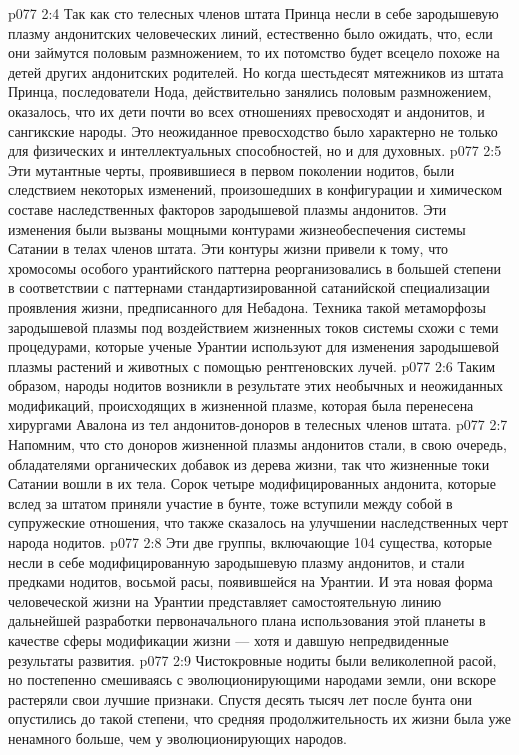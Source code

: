 \vs p077 2:4 Так как сто телесных членов штата Принца несли в себе зародышевую плазму андонитских человеческих линий, естественно было ожидать, что, если они займутся половым размножением, то их потомство будет всецело похоже на детей других андонитских родителей. Но когда шестьдесят мятежников из штата Принца, последователи Нода, действительно занялись половым размножением, оказалось, что их дети почти во всех отношениях превосходят и андонитов, и сангикские народы. Это неожиданное превосходство было характерно не только для физических и интеллектуальных способностей, но и для духовных.
\vs p077 2:5 Эти мутантные черты, проявившиеся в первом поколении нодитов, были следствием некоторых изменений, произошедших в конфигурации и химическом составе наследственных факторов зародышевой плазмы андонитов. Эти изменения были вызваны мощными контурами жизнеобеспечения системы Сатании в телах членов штата. Эти контуры жизни привели к тому, что хромосомы особого урантийского паттерна реорганизовались в большей степени в соответствии с паттернами стандартизированной сатанийской специализации проявления жизни, предписанного для Небадона. Техника такой метаморфозы зародышевой плазмы под воздействием жизненных токов системы схожи с теми процедурами, которые ученые Урантии используют для изменения зародышевой плазмы растений и животных с помощью рентгеновских лучей.
\vs p077 2:6 Таким образом, народы нодитов возникли в результате этих необычных и неожиданных модификаций, происходящих в жизненной плазме, которая была перенесена хирургами Авалона из тел андонитов\hyp{}доноров в телесных членов штата.
\vs p077 2:7 \pc Напомним, что сто доноров жизненной плазмы андонитов стали, в свою очередь, обладателями органических добавок из дерева жизни, так что жизненные токи Сатании вошли в их тела. Сорок четыре модифицированных андонита, которые вслед за штатом приняли участие в бунте, тоже вступили между собой в супружеские отношения, что также сказалось на улучшении наследственных черт народа нодитов.
\vs p077 2:8 Эти две группы, включающие 104 существа, которые несли в себе модифицированную зародышевую плазму андонитов, и стали предками нодитов, восьмой расы, появившейся на Урантии. И эта новая форма человеческой жизни на Урантии представляет самостоятельную линию дальнейшей разработки первоначального плана использования этой планеты в качестве сферы модификации жизни --- хотя и давшую непредвиденные результаты развития.
\vs p077 2:9 \pc Чистокровные нодиты были великолепной расой, но постепенно смешиваясь с эволюционирующими народами земли, они вскоре растеряли свои лучшие признаки. Спустя десять тысяч лет после бунта они опустились до такой степени, что средняя продолжительность их жизни была уже ненамного больше, чем у эволюционирующих народов.
